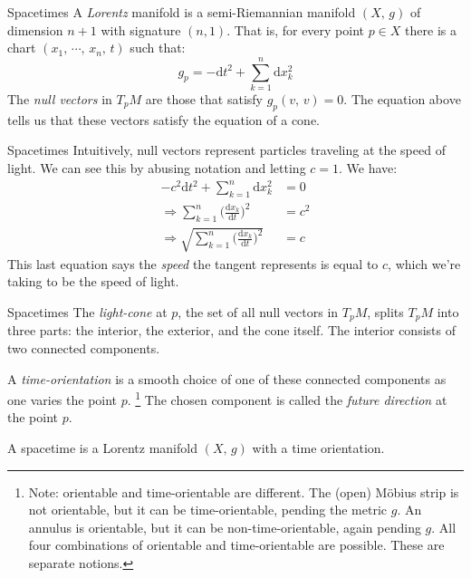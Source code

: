 \documentclass{beamer}
\begin{document}
    \begin{frame}{Spacetimes}
        A \textit{Lorentz} manifold is a semi-Riemannian manifold $(X,\,g)$ of
        dimension $n+1$ with signature $(n,1)$. That is, for every point
        $p\in{X}$ there is a chart $(x_{1},\,\cdots,\,x_{n},\,t)$ such that:
        \begin{equation}
            g_{p}=-\textrm{d}t^{2}+\sum_{k=1}^{n}\textrm{d}x_{k}^{2}
        \end{equation}
        The \textit{null vectors} in $T_{p}M$ are those that satisfy
        $g_{p}(v,\,v)=0$. The equation above tells us that these vectors
        satisfy the equation of a cone.
    \end{frame}
    \begin{frame}{Spacetimes}
        Intuitively, null vectors represent particles traveling at the speed of
        light. We can see this by abusing notation and letting $c=1$. We have:
        \begin{align}
            -c^{2}\textrm{d}t^{2}+\sum_{k=1}^{n}\textrm{d}x_{k}^{2}&=0\\
            \Rightarrow
            \sum_{k=1}^{n}\Big(\frac{\textrm{d}x_{k}}{\textrm{d}t}\Big)^{2}
                &=c^{2}\\
            \Rightarrow
            \sqrt{\sum_{k=1}^{n}\Big(\frac{\textrm{d}x_{k}}{\textrm{d}t}\Big)^{2}}
            &=c
        \end{align}
        This last equation says the \textit{speed} the tangent represents is
        equal to $c$, which we're taking to be the speed of light.
    \end{frame}
    \begin{frame}{Spacetimes}
        The \textit{light-cone} at $p$, the set of all null vectors in
        $T_{p}M$, splits $T_{p}M$ into three parts: the interior, the exterior,
        and the cone itself. The interior consists of two connected components.
        \par\hfill\par
        A \textit{time-orientation} is a smooth choice of one of these connected
        components as one varies the point $p$.%
        \footnote{%
            Note: orientable and time-orientable are different. The (open)
            M\"{o}bius strip is not orientable, but it can be time-orientable,
            pending the metric $g$. An annulus is orientable, but it can be
            non-time-orientable, again pending $g$. All four combinations of
            orientable and time-orientable are possible. These are separate
            notions.
        }
        The chosen component is called the \textit{future direction} at the
        point $p$.
        \par\hfill\par
        A spacetime is a Lorentz manifold $(X,\,g)$ with a time orientation.
    \end{frame}
\end{document}
